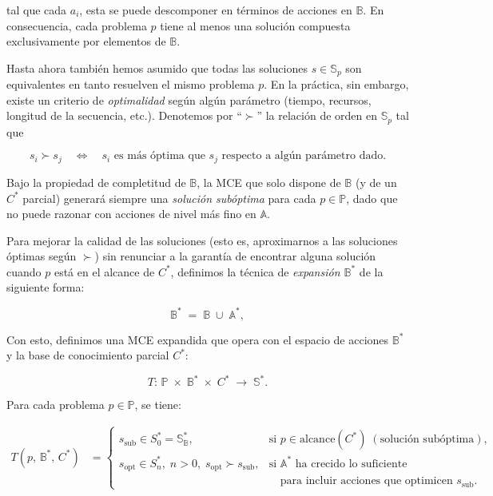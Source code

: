 tal que cada \(a_i\), esta se puede descomponer en términos de acciones en
\(\mathbb{B}\). En consecuencia, cada problema \(p\) tiene al menos una solución
compuesta exclusivamente por elementos de \(\mathbb{B}\).


Hasta ahora también hemos asumido que todas las soluciones \(s \in
\mathbb{S}_p\) son equivalentes en tanto resuelven el mismo problema \(p\). En
la práctica, sin embargo, existe un criterio de \emph{optimalidad} según algún
parámetro (tiempo, recursos, longitud de la secuencia, etc.). Denotemos por
“\(\succ\)” la relación de orden en \(\mathbb{S}_p\) tal que

\begin{equation}
s_i \succ s_j 
\quad \Longleftrightarrow \quad 
\text{\(s_i\) es más óptima que \(s_j\) respecto a algún parámetro dado.}
\end{equation}

Bajo la propiedad de completitud de \(\mathbb{B}\), la MCE que solo dispone de
\(\mathbb{B}\) (y de un \(C^*\) parcial) generará siempre una \emph{solución
subóptima} para cada \(p \in \mathbb{P}\), dado que no puede razonar con
acciones de nivel más fino en \(\mathbb{A}\). 

Para mejorar la calidad de las soluciones (esto es, aproximarnos a las
soluciones óptimas según \(\succ\)) sin renunciar a la garantía de encontrar
alguna solución cuando \(p\) está en el alcance de \(C^*\), definimos la técnica
de \emph{expansión \(\mathbb{B}^*\)} de la siguiente forma:

\begin{equation}
\mathbb{B}^* \;=\; \mathbb{B} \;\cup\; \mathbb{A}^*,
\end{equation}

Con esto, definimos una MCE expandida que opera con el espacio de acciones
\(\mathbb{B}^*\) y la base de conocimiento parcial \(C^*\):

\begin{equation}
T:\, \mathbb{P} \;\times\; \mathbb{B}^* \;\times\; C^* 
\;\longrightarrow\; \mathbb{S}^*.
\end{equation}

Para cada problema \(p \in \mathbb{P}\), se tiene:

\begin{equation}
\begin{aligned}
T(p,\,\mathbb{B}^*,\,C^*) 
&= 
\begin{cases}
s_{\text{sub}} \in S_0^* = \mathbb{S}_{\mathbb{B}}^*, 
& \text{si } p \in \mathrm{alcance}(C^*) 
\;(\text{solución subóptima}), \\
s_{\text{opt}} \in S_n^*,\; n>0,\; s_{\text{opt}}\succ s_{\text{sub}}, 
& \text{si } \mathbb{A}^*\text{ ha crecido lo suficiente} \\
& \quad \text{para incluir acciones que optimicen } s_{\text{sub}}.
\end{cases}
\end{aligned}
\end{equation}

